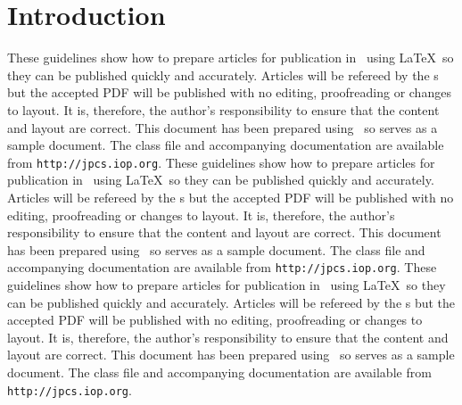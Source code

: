 \documentclass[a4paper]{jpconf}
\begin{document}
\section{Introduction}
These guidelines show how to prepare articles for publication in \jpcs\ using \LaTeX\ so they can be published quickly and accurately. Articles will be refereed by the \corg s but the accepted PDF will be published with no editing, proofreading or changes to layout. It is, therefore, the author's responsibility to ensure that the content and layout are correct.  This document has been prepared using \cls\ so serves as a sample document. The class file and accompanying documentation are available from \verb"http://jpcs.iop.org".
These guidelines show how to prepare articles for publication in \jpcs\ using \LaTeX\ so they can be published quickly and accurately. Articles will be refereed by the \corg s but the accepted PDF will be published with no editing, proofreading or changes to layout. It is, therefore, the author's responsibility to ensure that the content and layout are correct.  This document has been prepared using \cls\ so serves as a sample document. The class file and accompanying documentation are available from \verb"http://jpcs.iop.org".
These guidelines show how to prepare articles for publication in \jpcs\ using \LaTeX\ so they can be published quickly and accurately. Articles will be refereed by the \corg s but the accepted PDF will be published with no editing, proofreading or changes to layout. It is, therefore, the author's responsibility to ensure that the content and layout are correct.  This document has been prepared using \cls\ so serves as a sample document. The class file and accompanying documentation are available from \verb"http://jpcs.iop.org".
\end{document}

